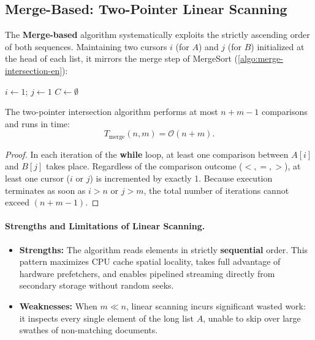 \subsection{Merge-Based: Two-Pointer Linear Scanning}
The \textbf{Merge-based} algorithm systematically exploits the strictly ascending order of both sequences. Maintaining two cursors $i$ (for $A$) and $j$ (for $B$) initialized at the head of each list, it mirrors the merge step of MergeSort (\autoref{algo:merge-intersection-en}):

\begin{algorithm}[htbp]
\SetAlgoLined
{}
$i \leftarrow 1$; $j \leftarrow 1$\;
$C \leftarrow \emptyset$\;
\;
\caption{Two-Pointer Merge-Based Set Intersection}
\label{algo:merge-intersection-en}
\end{algorithm}

\begin{theorem}
The two-pointer intersection algorithm performs at most $n + m - 1$ comparisons and runs in time:
\begin{equation}
  T_{\text{merge}}(n, m) = \mathcal{O}(n + m).
\end{equation}
\end{theorem}
\begin{proof}
In each iteration of the \textbf{while} loop, at least one comparison between $A[i]$ and $B[j]$ takes place. Regardless of the comparison outcome ($<, =, >$), at least one cursor ($i$ or $j$) is incremented by exactly 1. Because execution terminates as soon as $i > n$ or $j > m$, the total number of iterations cannot exceed $(n + m - 1)$.
\end{proof}

\paragraph{Strengths and Limitations of Linear Scanning.}
\begin{itemize}
  \item \textbf{Strengths:} The algorithm reads elements in strictly \textbf{sequential} order. This pattern maximizes CPU cache spatial locality, takes full advantage of hardware prefetchers, and enables pipelined streaming directly from secondary storage without random seeks.
  \item \textbf{Weaknesses:} When $m \ll n$, linear scanning incurs significant wasted work: it inspects every single element of the long list $A$, unable to skip over large swathes of non-matching documents.
\end{itemize}

